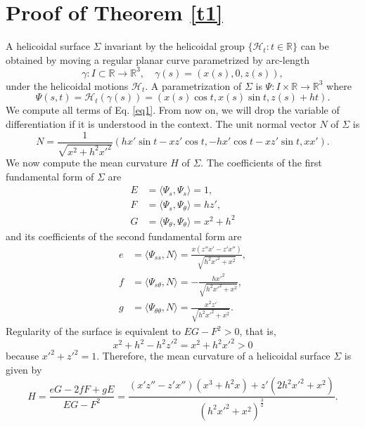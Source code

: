 \documentclass[a4paper,12pt]{amsart}
\theoremstyle{definition}
\def\r{\mathbb R}
\begin{document}
  
  \section{Proof of Theorem \ref{t1}}
  
  
  A helicoidal surface $\Sigma$ invariant by the helicoidal group $\{\mathcal{H}_t\colon t\in\r\}$     can be obtained by moving a regular planar curve parametrized by arc-length
$$\gamma\colon I\subset\r\to\r^3,\quad \gamma(s)=(x(s),0,z(s)),$$ 
under the helicoidal motions $\mathcal{H}_t$. A parametrization of $\Sigma$ is $\Psi\colon I\times\r\to\r^3$ where
\begin{equation}\label{para}
\Psi(s,t)=\mathcal{H}_t(\gamma(s))=(x(s)\cos t,x(s)\sin t,z(s)+ht).
\end{equation}
We compute all terms of Eq. \eqref{eq1}. From now on, we will drop the variable of differentiation if it is understood in the context. The unit normal vector $N$ of $\Sigma$ is 
\begin{equation}\label{normal}
N=\frac{1}{\sqrt{x^2+h^2x'^2}}\left(hx'\sin t-xz'\cos t,-hx'\cos t-xz'\sin t,xx'\right).
\end{equation}
We now compute the mean curvature $H$ of $\Sigma$.  The coefficients of the first fundamental form of $\Sigma$ are
\begin{align*}
    E &= \langle \Psi_s, \Psi_s \rangle = 1, \\
    F &= \langle \Psi_s, \Psi_\theta \rangle = hz', \\
    G &= \langle \Psi_\theta, \Psi_\theta \rangle =  x^2 + h^2
    \end{align*}
and its coefficients of the second fundamental form are
\begin{align*}
    e &= \langle \Psi_{ss} , N \rangle = \frac{x\left( z''x' - z'x''\right)}{\sqrt{h^2x'^2 + x^2}}, \\
    f &= \langle \Psi_{s\theta} , N \rangle = -\frac{hx'^2}{\sqrt{h^2x'^2 + x^2}},\\
    g &= \langle \Psi_{\theta\theta} , N \rangle = \frac{x^2z'}{\sqrt{h^2x'^2 + x^2}}.
\end{align*}
Regularity of the surface is equivalent to $EG-F^2>0$, that is, 
$$x^2+h^2-h^2z'^2=x^2+h^2 x'^2>0$$
because $x'^2+z'^2=1$. Therefore, the mean curvature of a helicoidal surface $\Sigma$ is given by
\begin{equation}\label{mean}
 H = \frac{eG - 2fF + gE}{EG-F^2} = \frac{(x'z''-z'x'')(x^3+h^2x) + z'(2h^2x'^2+x^2)}{(h^2x'^2+x^2)^{\frac{3}{2}}}.
\end{equation}
\end{document}
